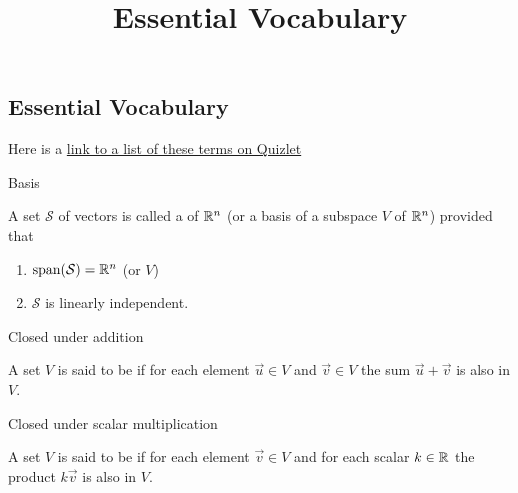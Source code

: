 \documentclass{ximera}
\title{Essential Vocabulary} \license{CC BY-NC-SA 4.0}
\begin{document}
\begin{abstract}
\end{abstract}
\maketitle


\begin{onlineOnly}
\section*{Essential Vocabulary}
Here is a  \href{https://quizlet.com/880920639/chapter-5-vocabulary-flash-cards/?i=y06sd&x=1jqt}{link to a list of these terms on Quizlet}
\end{onlineOnly}

Basis
\begin{expandable}
A set $\mathcal{S}$ of vectors is called a  of $\mathbb{R}^n$ (or a basis of a subspace $V$ of $\mathbb{R}^n$) provided that 
\begin{enumerate}
\item 
$\mbox{span}(\mathcal{S})=\mathbb{R}^n$ (or $V$)
\item 
$\mathcal{S}$ is linearly independent.
\end{enumerate}
\end{expandable}


Closed under addition
\begin{expandable}
    A set $V$ is said to be  if for each element $\vec{u} \in V$ and $\vec{v} \in V$ the sum $\vec{u}+\vec{v}$ is also in $V$.
\end{expandable}


 Closed under scalar multiplication
\begin{expandable}
    A set $V$ is said to be  if for each element $\vec{v} \in V$  and for each scalar $k \in \mathbb{R}$ the product $k\vec{v}$ is also in $V$.
\end{expandable}

\end{document}
